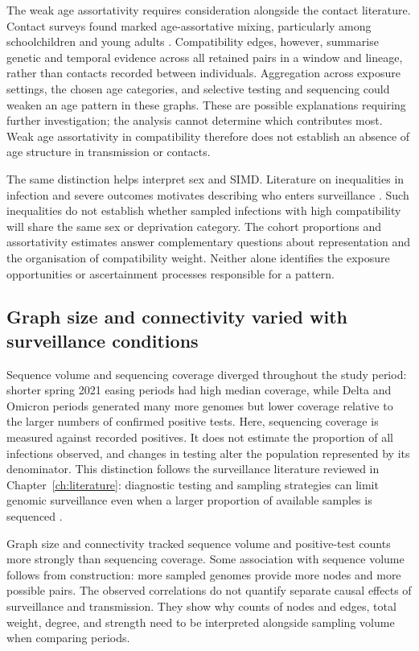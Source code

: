 The weak age assortativity requires consideration alongside the contact literature. Contact surveys found marked age-assortative mixing, particularly among schoolchildren and young adults \citep{Mossong2008}. Compatibility edges, however, summarise genetic and temporal evidence across all retained pairs in a window and lineage, rather than contacts recorded between individuals. Aggregation across exposure settings, the chosen age categories, and selective testing and sequencing could weaken an age pattern in these graphs. These are possible explanations requiring further investigation; the analysis cannot determine which contributes most. Weak age assortativity in compatibility therefore does not establish an absence of age structure in transmission or contacts.

The same distinction helps interpret sex and SIMD. Literature on inequalities in infection and severe outcomes motivates describing who enters surveillance \citep{PublicHealthScotland2020,Bambra2020,Niedzwiedz2020}. Such inequalities do not establish whether sampled infections with high compatibility will share the same sex or deprivation category. The cohort proportions and assortativity estimates answer complementary questions about representation and the organisation of compatibility weight. Neither alone identifies the exposure opportunities or ascertainment processes responsible for a pattern.

\subsection{Graph size and connectivity varied with surveillance conditions}\label{sec:ch4_discussion_surveillance}

Sequence volume and sequencing coverage diverged throughout the study period: shorter spring 2021 easing periods had high median coverage, while Delta and Omicron periods generated many more genomes but lower coverage relative to the larger numbers of confirmed positive tests. Here, sequencing coverage is measured against recorded positives. It does not estimate the proportion of all infections observed, and changes in testing alter the population represented by its denominator. This distinction follows the surveillance literature reviewed in Chapter~\ref{ch:literature}: diagnostic testing and sampling strategies can limit genomic surveillance even when a larger proportion of available samples is sequenced \citep{Han2023}.

Graph size and connectivity tracked sequence volume and positive-test counts more strongly than sequencing coverage. Some association with sequence volume follows from construction: more sampled genomes provide more nodes and more possible pairs. The observed correlations do not quantify separate causal effects of surveillance and transmission. They show why counts of nodes and edges, total weight, degree, and strength need to be interpreted alongside sampling volume when comparing periods.

